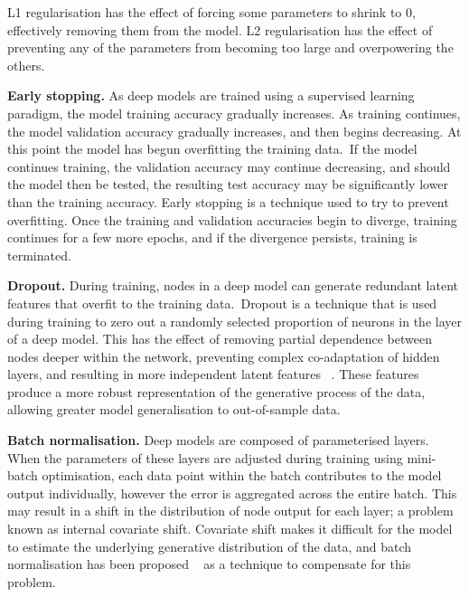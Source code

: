 \noindent L1 regularisation has the effect of forcing some parameters to shrink to 0, effectively removing them from the model. L2 regularisation has the effect of preventing any of the parameters from becoming too large and overpowering the others. \par

\noindent \textbf{Early stopping.} As deep models are trained using a supervised learning paradigm, the model training accuracy gradually increases. As training continues, the model validation accuracy gradually increases, and then begins decreasing. At this point the model has begun overfitting the training data.\ If the model continues training, the validation accuracy may continue decreasing, and should the model then be tested, the resulting test accuracy may be significantly lower than the training accuracy. Early stopping is a technique used to try to prevent overfitting. Once the training and validation accuracies begin to diverge, training continues for a few more epochs, and if the divergence persists, training is terminated. \par

\noindent \textbf{Dropout.} During training, nodes in a deep model can generate redundant latent features that overfit to the training data.\ Dropout is a technique that is used during training to zero out a randomly selected proportion of neurons in the layer of a deep model. This has the effect of removing partial dependence between nodes deeper within the network, preventing complex co-adaptation of hidden layers, and resulting in more independent latent features \unskip ~\citep{hinton2012improving}. These features produce a more robust representation of the generative process of the data, allowing greater model generalisation to out-of-sample data. \par

\noindent \textbf{Batch normalisation.} Deep models are composed of parameterised layers. When the parameters of these layers are adjusted during training using mini-batch optimisation, each data point within the batch contributes to the model output individually, however the error is aggregated across the entire batch. This may result in a shift in the distribution of node output for each layer; a problem known as internal covariate shift. Covariate shift makes it difficult for the model to estimate the underlying generative distribution of the data, and batch normalisation has been proposed \unskip ~\citep{ioffe2015batch} as a technique to compensate for this problem. \par

